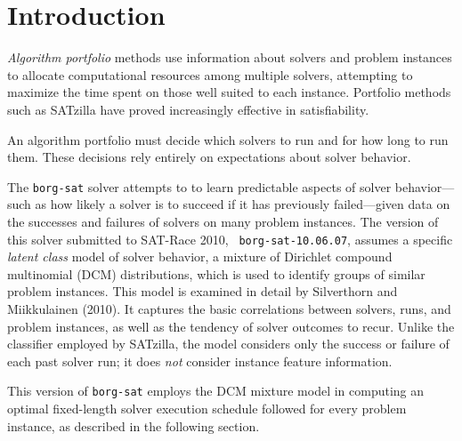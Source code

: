 \section{Introduction}

\emph{Algorithm portfolio} methods \cite{Huberman1997Economics} use information
about solvers and problem instances to allocate computational resources among
multiple solvers, attempting to maximize the time spent on those well suited to
each instance. Portfolio methods such as SATzilla \cite{Xu2008SATzilla} have
proved increasingly effective in satisfiability.

An algorithm portfolio must decide which solvers to run and for how long to run
them. These decisions rely entirely on expectations about solver behavior.

The {\tt borg-sat} solver attempts to to learn predictable aspects of solver
behavior---such as how likely a solver is to succeed if it has previously
failed---given data on the successes and failures of solvers on many problem
instances. The version of this solver submitted to SAT-Race 2010, {\tt
borg-sat-10.06.07}, assumes a specific \emph{latent class} model of solver
behavior, a mixture of Dirichlet compound multinomial (DCM) distributions,
which is used to identify groups of similar problem instances. This model is
examined in detail by Silverthorn and Miikkulainen
(2010)\nocite{Silverthorn2010latent}. It captures the basic correlations
between solvers, runs, and problem instances, as well as the tendency of solver
outcomes to recur. Unlike the classifier employed by SATzilla, the model
considers only the success or failure of each past solver run; it does
\emph{not} consider instance feature information.

This version of {\tt borg-sat} employs the DCM mixture
model in computing an optimal fixed-length solver execution schedule followed
for every problem instance, as described in the following section.

